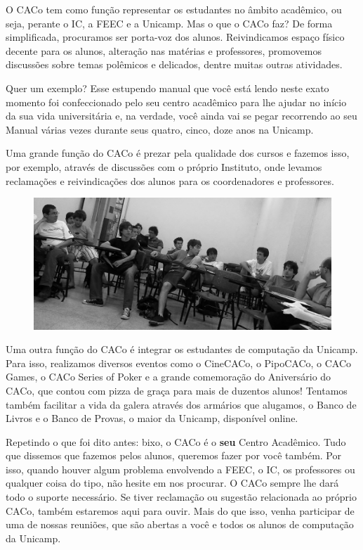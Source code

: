 O CACo tem como função representar os estudantes no âmbito acadêmico, ou seja,
perante o IC, a FEEC e a Unicamp. Mas o que o CACo faz? De forma simplificada,
procuramos ser porta-voz dos alunos. Reivindicamos espaço físico decente para os
alunos, alteração nas matérias e professores, promovemos discussões sobre temas
polêmicos e delicados, dentre muitas outras atividades.

Quer um exemplo? Esse estupendo manual que você está lendo neste exato momento
foi confeccionado pelo seu centro acadêmico para lhe ajudar no início da sua
vida universitária e, na verdade, você ainda vai se pegar recorrendo ao seu
Manual várias vezes durante seus quatro, cinco, doze anos na Unicamp.

Uma grande função do CACo é prezar pela qualidade dos cursos e fazemos isso, por
exemplo, através de discussões com o próprio Instituto, onde levamos reclamações
e reivindicações dos alunos para os coordenadores e professores.

\begin{figure}[H]
    \centering
    \includegraphics[width=.45\textwidth]{img/alem_da_graduacao/caco_reuniao.jpg}
\end{figure}

Uma outra função do CACo é integrar os estudantes de computação da Unicamp. Para
isso, realizamos diversos eventos como o CineCACo, o PipoCACo, o CACo Games, o
CACo Series of Poker e a grande comemoração do Aniversário do CACo, que contou
com pizza de graça para mais de duzentos alunos! Tentamos também facilitar a
vida da galera através dos armários que alugamos, o Banco de Livros e o Banco de
Provas, o maior da Unicamp, disponível online.

Repetindo o que foi dito antes: bixo, o CACo é o \textbf{seu} Centro Acadêmico.
Tudo que dissemos que fazemos pelos alunos, queremos fazer por você também. Por
isso, quando houver algum problema envolvendo a FEEC, o IC, os professores ou
qualquer coisa do tipo, não hesite em nos procurar. O CACo sempre lhe dará todo
o suporte necessário. Se tiver reclamação ou sugestão relacionada ao próprio
CACo, também estaremos aqui para ouvir. Mais do que isso, venha participar de
uma de nossas reuniões, que são abertas a você e todos os alunos de computação
da Unicamp.

